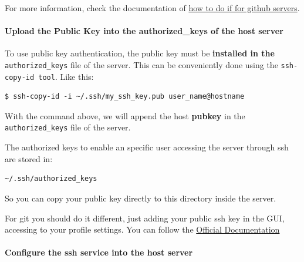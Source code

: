 \documentclass{article}
\newenvironment{blocktemplateII}[1]{%
    \tcolorbox[beamer,%
    noparskip,breakable,
    colframe=Green,%
    colbacklower=LimeGreen!75!LightGreen,%
    title=#1]}%
    {\endtcolorbox}
\newenvironment{blocktemplateIII}[1]{%
    \tcolorbox[beamer,%
    noparskip,breakable,
    ,colframe=Red,%
    colbacklower=LimeGreen!75!LightGreen,%
    title=#1]}%
    {\endtcolorbox}
\newenvironment{codetemplate}[1][]{%
  \mybasecolorbox[#1]
  \itshape
}{%
  \endmybasecolorbox
}
\begin{document}
For more information, check the documentation of \href{https://docs.github.com/en/authentication/connecting-to-github-with-ssh/generating-a-new-ssh-key-and-adding-it-to-the-ssh-agent}{how to do if for github servers}.

\paragraph{Upload the Public Key into the authorized\_keys of the host server}
To use public key authentication, the public key must be \textbf{installed in the} \verb|authorized_keys| file of the server. This can be conveniently done using the \verb|ssh-copy-id tool|. Like this:

\begin{codetemplate}{}
\begin{verbatim}
$ ssh-copy-id -i ~/.ssh/my_ssh_key.pub user_name@hostname
\end{verbatim}
\end{codetemplate}

\begin{blocktemplateIII}{WARNING}
With the command above, we will append the host \textbf{pubkey} in the \verb|authorized_keys| file of the server.
\end{blocktemplateIII}

The authorized keys to enable an specific user accessing the server through ssh are stored in:

\begin{codetemplate}{}
\begin{verbatim}
~/.ssh/authorized_keys
\end{verbatim}
\end{codetemplate}
    
So you can copy your public key directly to this directory inside the server.

\begin{blocktemplateII}{NOTE}
For git you should do it different, just adding your public ssh key in the GUI, accessing to your profile settings. You can follow the \href{https://docs.github.com/en/authentication/connecting-to-github-with-ssh/adding-a-new-ssh-key-to-your-github-account}{Official Documentation}
\end{blocktemplateII}

\paragraph{Configure the ssh service into the host server}
\end{document}
